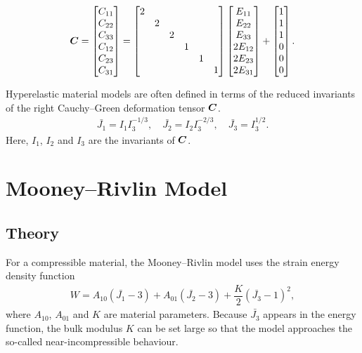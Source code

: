 \begin{gather}
    \bm{C}=\begin{bmatrix}
        C_{11} \\
        C_{22} \\
        C_{33} \\
        C_{12} \\
        C_{23} \\
        C_{31}
    \end{bmatrix}=\begin{bmatrix}
        2 &   &   &   &   &   \\
          & 2 &   &   &   &   \\
          &   & 2 &   &   &   \\
          &   &   & 1 &   &   \\
          &   &   &   & 1 &   \\
          &   &   &   &   & 1 \\
    \end{bmatrix}\begin{bmatrix}
        E_{11}  \\
        E_{22}  \\
        E_{33}  \\
        2E_{12} \\
        2E_{23} \\
        2E_{31}
    \end{bmatrix}+\begin{bmatrix}
        1 \\1\\1\\0\\0\\0
    \end{bmatrix}.
\end{gather}

Hyperelastic material models are often defined in terms of the reduced invariants of the right Cauchy--Green deformation tensor $\bm{C}$.
\begin{gather}
\bar{J_1}=I_1I_3^{-1/3},\quad
\bar{J_2}=I_2I_3^{-2/3},\quad
\bar{J_3}=I_3^{1/2}.
\end{gather}
Here, $I_1$, $I_2$ and $I_3$ are the invariants of $\bm{C}$.
\section{Mooney--Rivlin Model}
\subsection{Theory}
For a compressible material, the Mooney--Rivlin model uses the strain energy density function
\begin{gather}
W=A_{10}\left(\bar{J_1}-3\right)+A_{01}\left(\bar{J_2}-3\right)+\dfrac{K}{2}\left(\bar{J_3}-1\right)^2,
\end{gather}
where $A_{10}$, $A_{01}$ and $K$ are material parameters.
Because $\bar{J_3}$ appears in the energy function, the bulk modulus $K$ can be set large so that the model approaches the so-called near-incompressible behaviour.

